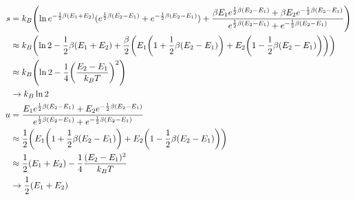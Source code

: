 \documentclass[uplatex,dvipdfmx,a4paper,11pt]{jlreq}
\theoremstyle{definition}
\begin{document}
\begin{align}
  s & = k_B\qty(\ln e^{-\frac{1}{2}\beta (E_1 + E_2)}(e^{\frac{1}{2}\beta (E_2 - E_1)} + e^{-\frac{1}{2}\beta (E_2 - E_1)}) + \frac{\beta E_1e^{\frac{1}{2}\beta (E_2 - E_1)} + \beta E_2e^{-\frac{1}{2}\beta (E_2 - E_1)}}{e^{\frac{1}{2}\beta (E_2 - E_1)} + e^{-\frac{1}{2}\beta (E_2 - E_1)}}) \\
    & \approx k_B\qty(\ln 2 - \frac{1}{2}\beta (E_1 + E_2) + \frac{\beta}{2}\qty(E_1\qty(1 + \frac{1}{2}\beta (E_2 - E_1)) + E_2\qty(1 - \frac{1}{2}\beta (E_2 - E_1))))                                                                                                                           \\
    & \approx k_B\qty(\ln 2 - \frac{1}{4}\qty(\frac{E_2 - E_1}{k_BT})^2)                                                                                                                                                                                                                           \\
    & \to k_B\ln 2                                                                                                                                                                                                                                                                                 \\
  u & = \frac{E_1e^{\frac{1}{2}\beta (E_2 - E_1)} + E_2e^{-\frac{1}{2}\beta (E_2 - E_1)}}{e^{\frac{1}{2}\beta (E_2 - E_1)} + e^{-\frac{1}{2}\beta (E_2 - E_1)}}                                                                                                                                    \\
    & \approx \frac{1}{2}\qty(E_1\qty(1 + \frac{1}{2}\beta (E_2 - E_1)) + E_2\qty(1 - \frac{1}{2}\beta (E_2 - E_1)))                                                                                                                                                                               \\
    & \approx \frac{1}{2}(E_1 + E_2) - \frac{1}{4}\frac{(E_2 - E_1)^2}{k_BT}                                                                                                                                                                                                                       \\
    & \to \frac{1}{2}(E_1 + E_2)                                                                                                                                                                                                                                                                   \\

\end{align}
\end{document}
